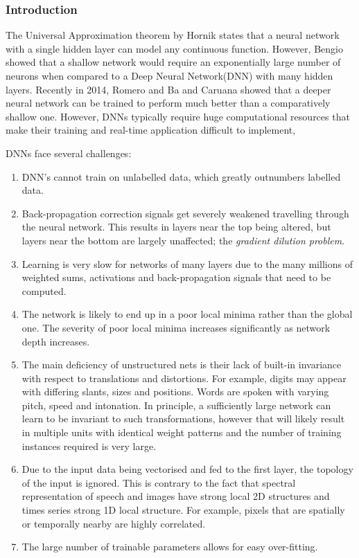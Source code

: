 \subsubsection{Introduction}

The Universal Approximation theorem by Hornik\citep{hornik1991approximation} states that a neural network with a single hidden layer can model any continuous function.
However, Bengio\citep{bengio2009learning} showed that a shallow network would require an exponentially large number of neurons when compared to a Deep Neural Network(DNN) with many hidden layers.
Recently in 2014, Romero\citep{romero2014fitnets} and Ba and Caruana\citep{ba2014deep} showed that a deeper neural network can be trained to perform much better than a comparatively shallow one.
However, DNNs typically require huge computational resources that make their training and real-time application difficult to implement\citep{goyal2014object},

DNNs face several challenges\citep{mo2012survey}:
\begin{enumerate}
\item DNN's cannot train on unlabelled data, which greatly outnumbers labelled data.
\item Back-propagation correction signals get severely weakened travelling through the neural network.
This results in layers near the top being altered, but layers near the bottom are largely unaffected; the \textit{gradient dilution problem}\citep{bengio2009learning}.
\item Learning is very slow for networks of many layers due to the many millions of weighted sums, activations and back-propagation signals that need to be computed.
\item The network is likely to end up in a poor local minima rather than the global one.
The severity of poor local minima increases significantly as network depth increases\citep{dengthree}.
\item The main deficiency of unstructured nets is their lack of built-in invariance with respect to translations and distortions\citep{lecun1995convolutional}.
For example, digits may appear with differing slants, sizes and positions.
Words are spoken with varying pitch, speed and intonation.
In principle, a sufficiently large network can learn to be invariant to such transformations, however that will likely result in multiple units with identical weight patterns and the number of training instances required is very large\citep{lecun1995convolutional}.
\item Due to the input data being vectorised and fed to the first layer, the topology of the input is ignored.
This is contrary to the fact that spectral representation of speech and images have strong local 2D structures and times series strong 1D local structure.
For example, pixels that are spatially or temporally nearby are highly correlated\citep{lecun1995convolutional}.
\item The large number of trainable parameters allows for easy over-fitting.
\end{enumerate}

